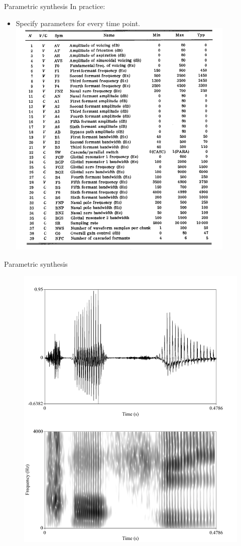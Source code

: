 \documentclass{beamer}
\begin{document}
\begin{frame}{Parametric synthesis}
In practice:
\begin{itemize}
\item{Specify parameters for every time point.}
\includegraphics[scale=0.4,keepaspectratio]{klatt_param.png}
\end{itemize}
\end{frame}
\begin{frame}{Parametric synthesis}
\begin{figure}
\includegraphics[scale=0.3,keepaspectratio]{coffee_klatt.pdf}
\end{figure}
\centering
{}
\end{frame}
\end{document}
